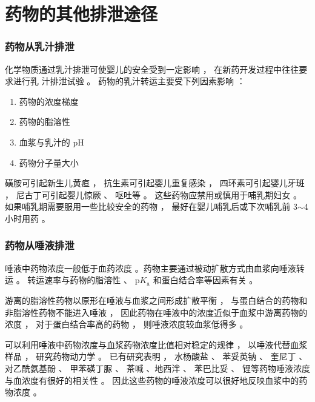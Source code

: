 \documentclass[dvipsnames, svgnames, x11names]{beamer}
\begin{document}
\section{药物的其他排泄途径}


\begin{frame}
    \frametitle{药物从乳汁排泄}
    化学物质通过乳汁排泄可使婴儿的安全受到一定影响 ， 在新药开发过程中往往要求进行乳
汁排泄试验 。 药物的乳汁转运主要受下列因素影响 ：
    \begin{enumerate}
      \item 药物的浓度梯度
      \item 药物的脂溶性
      \item 血浆与乳汁的 pH
      \item 药物分子量大小
    \end{enumerate}
    \begin{blankblock}{}
        磺胺可引起新生儿黄疸 ， 抗生素可引起婴儿重复感染 ， 四环素可引起婴儿牙斑 ， 尼古丁可引起婴儿惊厥 、 呕吐等 。 这些药物应禁用或慎用于哺乳期妇女 。 如果哺乳期需要服用一些比较安全的药物 ， 最好在婴儿哺乳后或下次哺乳前 3$\sim$4 小时用药 。
    \end{blankblock}
\end{frame}


\begin{frame}
    \frametitle{药物从唾液排泄}
    唾液中药物浓度一般低于血药浓度 。药物主要通过被动扩散方式由血浆向唾液转运 。 转运速率与药物的脂溶性 、 p$K_\mathrm{a}$ 和蛋白结合率等因素有关 。 

    游离的脂溶性药物以原形在唾液与血浆之间形成扩散平衡 ， 与蛋白结合的药物和非脂溶性药物不能进入唾液 ， 因此药物在唾液中的浓度近似于血浆中游离药物的浓度 ， 对于蛋白结合率高的药物 ， 则唾液浓度较血浆低得多 。
    \begin{blankblock}{}
        可以利用唾液中药物浓度与血浆药物浓度比值相对稳定的规律 ， 以唾液代替血浆样品 ， 研究药物动力学 。 已有研究表明 ， 水杨酸盐 、 苯妥英钠 、 奎尼丁 、 对乙酰氨基酚 、 甲苯磺丁脲 、 茶喊 、地西泮 、 苯巴比妥 、 锂等药物唾液浓度与血浓度有很好的相关性 。 因此这些药物的唾液浓度可以很好地反映血浆中的药物浓度 。
    \end{blankblock}
\end{frame}
\end{document}
